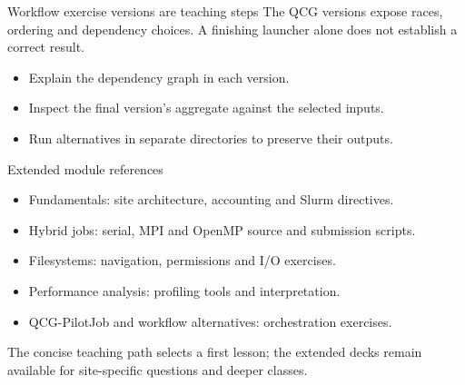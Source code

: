 \documentclass[aspectratio=169,11pt]{beamer}
\begin{document}
\begin{frame}{Workflow exercise versions are teaching steps}
The QCG versions expose races, ordering and dependency choices. A finishing
launcher alone does not establish a correct result.
\begin{itemize}
\item Explain the dependency graph in each version.
\item Inspect the final version's aggregate against the selected inputs.
\item Run alternatives in separate directories to preserve their outputs.
\end{itemize}
\end{frame}
\begin{frame}{Extended module references}
\begin{itemize}
\item Fundamentals: site architecture, accounting and Slurm directives.
\item Hybrid jobs: serial, MPI and OpenMP source and submission scripts.
\item Filesystems: navigation, permissions and I/O exercises.
\item Performance analysis: profiling tools and interpretation.
\item QCG-PilotJob and workflow alternatives: orchestration exercises.
\end{itemize}
The concise teaching path selects a first lesson; the extended decks remain
available for site-specific questions and deeper classes.
\end{frame}
\end{document}
